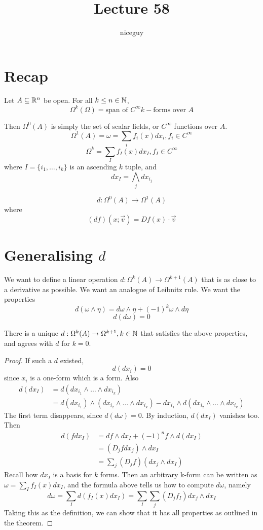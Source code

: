\documentclass[12pt]{article}
\title{Lecture 58}
\author{niceguy}
\begin{document}
\maketitle

\section{Recap}

Let $A \subseteq \mathbb{R}^n$ be open. For all $k \le n \in \mathbb{N}$,
$$\Omega^k(\Omega) = \text{span of } C^\infty k-\text{forms over } A$$

Then $\Omega^0(A)$ is simply the set of scalar fields, or $C^\infty$ functions over $A$. \\
$$\Omega^1(A) = \omega = \sum_i f_i(x)dx_i, f_i \in C^\infty$$
$$\Omega^k = \sum_I f_I(x)dx_I, f_I \in C^\infty$$
where $I = \{i_1,\dots,i_k\}$ is an ascending $k$ tuple, and
$$dx_I = \bigwedge_j dx_{i_j}$$

$$d: \Omega^0(A) \rightarrow \Omega^1(A)$$
where
$$(df)(x;\vec v) = Df(x) \cdot \vec v$$

\section{Generalising $d$}

We want to define a linear operation $d: \Omega^k(A) \rightarrow \Omega^{k+1}(A)$ that is as close to a derivative as possible. We want an analogue of Leibnitz rule. We want the properties
$$d(\omega \wedge \eta) = d\omega \wedge \eta + (-1)^k\omega \wedge d\eta$$
$$d(d\omega) = 0$$

\begin{thm}
    There is a unique $d: \Omega^k(A) \rightarrow \Omega^{k+1}, k \in \mathbb{N}$ that satisfies the above properties, and agrees with $d$ for $k = 0$.
\end{thm}

\begin{proof}
    If such a $d$ existed,
    $$d(dx_i) = 0$$
    since $x_i$ is a one-form which is a form. Also
    \begin{align*}
        d(dx_I) &= d(dx_{i_1} \wedge \dots \wedge dx_{i_k}) \\
                &= d(dx_{i_1}) \wedge (dx_{i_2} \wedge \dots \wedge dx_{i_k}) - dx_{i_1} \wedge d(dx_{i_2} \wedge \dots \wedge dx_{i_k})
    \end{align*}
    The first term disappears, since $d(d\omega) = 0$. By induction, $d(dx_I)$ vanishes too. Then
    \begin{align*}
        d(fdx_I) &= df \wedge dx_I + (-1)^nf \wedge d(dx_I) \\
                         &= (D_j f dx_j) \wedge dx_I \\
                         &= \sum_j (D_jf)(dx_j \wedge dx_I)
    \end{align*}
    Recall how $dx_I$ is a basis for $k$ forms. Then an arbitrary k-form can be written as $\omega = \sum_I f_I(x)dx_I$, and the formula above tells us how to compute $d\omega$, namely
    $$d\omega = \sum_I d(f_I(x)dx_I) = \sum_I\sum_j (D_jf_I)dx_j \wedge dx_I$$
    Taking this as the definition, we can show that it has all properties as outlined in the theorem.
\end{proof}
\end{document}
